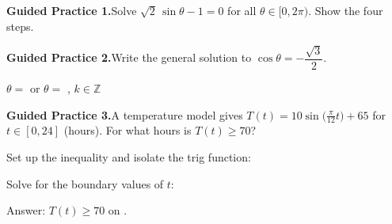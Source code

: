\documentclass[10pt]{article}
\begin{document}
\vspace{0.06in}

\begin{practicebox}

\textbf{Guided Practice 1.}\quad Solve $\sqrt{2}\,\sin\theta - 1 = 0$ for
all $\theta \in [0, 2\pi)$. Show the four steps.

\vspace{0.08in}
\textbf{Guided Practice 2.}\quad Write the general solution to $\cos\theta = -\dfrac{\sqrt{3}}{2}$.

\vspace{4pt}
$\theta = $ \blank{4.5cm} or $\theta = $ \blank{4.5cm}, $k \in \mathbb{Z}$

\vspace{0.08in}
\textbf{Guided Practice 3.}\quad A temperature model gives $T(t) = 10\sin\!\bigl(\tfrac{\pi}{12}t\bigr) + 65$
for $t \in [0, 24]$ (hours). For what hours is $T(t) \ge 70$?

\vspace{4pt}
Set up the inequality and isolate the trig function:

Solve for the boundary values of $t$:

Answer: $T(t) \ge 70$ on \blank{5cm}.

\end{practicebox}
\end{document}
